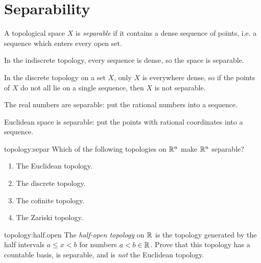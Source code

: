\section{Separability}
A topological space \(X\) is \emph{separable} if it contains a dense sequence of points, i.e. a sequence which enters every open set.
\begin{example}
In the indiscrete topology, every sequence is dense, so the space is separable.
\end{example}
\begin{example}
In the discrete topology on a set \(X\), only \(X\) is everywhere dense, so if the points of \(X\) do not all lie on a single sequence, then \(X\) is not separable.
\end{example}
\begin{example}
The real numbers are separable: put the rational numbers into a sequence.
\end{example}
\begin{example}
Euclidean space is separable: put the points with rational coordinates into a sequence.
\end{example}
\begin{problem}{topology:separ}
Which of the following topologies on \(\mathbb{R}^{n}\) make \(\mathbb{R}^{n}\) separable?
\begin{enumerate}
\item
The Euclidean topology.
\item
The discrete topology.
\item
The cofinite topology.
\item
The Zariski topology.
\end{enumerate}
\end{problem}
\begin{problem*}{topology:half.open}
The \emph{half-open topology} on \(\mathbb{R}^{}\) is the topology generated by the half intervals \(a \le x < b\) for numbers \(a < b \in \mathbb{R}^{}\).
Prove that this topology has a countable basis, is separable, and is \emph{not} the Euclidean topology.
\end{problem*}

